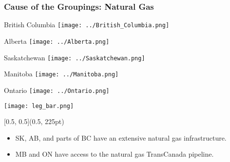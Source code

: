 \documentclass{beamer}
\begin{document}
\begin{frame}
\frametitle{Cause of the Groupings: Natural Gas}


\begin{minipage}[b]{0.2\textwidth}
\begin{center}
\tiny{British Columbia}
\texttt{[image: ../British\_Columbia.png]}%
\end{center}
\end{minipage}%
%
\begin{minipage}[b]{0.2\textwidth}
\begin{center}
\tiny{Alberta}
\texttt{[image: ../Alberta.png]}%
\end{center}
\end{minipage}%
%
\begin{minipage}[b]{0.2\textwidth}
\begin{center}
\tiny{Saskatchewan}
\texttt{[image: ../Saskatchewan.png]}%
\end{center}
\end{minipage}%
%
\begin{minipage}[b]{0.2\textwidth}
\begin{center}
\tiny{Manitoba}
\texttt{[image: ../Manitoba.png]}%
\end{center}
\end{minipage}%
%
\begin{minipage}[b]{0.2\textwidth}
\begin{center}
\tiny{Ontario}
\texttt{[image: ../Ontario.png]}%
\end{center}
\end{minipage}
\begin{center}
\texttt{[image: leg\_bar.png]}
\end{center}

\begin{textblock*}{\textwidth}[0.5, 0.5](0.5\linewidth, 225pt)
\begin{itemize}
	\item SK, AB, and parts of BC have an extensive natural gas infrastructure.
	\item MB and ON have access to the natural gas TransCanada pipeline.
\end{itemize}
\end{textblock*}

\end{frame}
\end{document}
